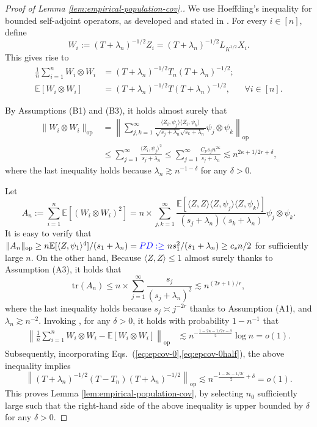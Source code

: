 \documentclass[aos]{imsart}
\newcommand{\tr}{\mathrm{tr}}
\newcommand{\op}{\mathrm{op}}
\newcommand{\pd}[1]{%
	{ \color{blue} PD: #1}%
}
\theoremstyle{plain}
\theoremstyle{definition}
\theoremstyle{definition}
\begin{document}
\begin{appendix}
\begin{proof}[Proof of Lemma \ref{lem:empirical-population-cov}.]
We use Hoeffding's inequality for bounded self-adjoint operators, as developed and stated in \citep{minsker2017some}.
For every $i\in[n]$, define
$$
W_i := (T+\lambda_n)^{-1/2}Z_i = (T+\lambda_n)^{-1/2}L_{K^{1/2}}X_i.
$$
This gives rise to
\begin{align}
\frac{1}{n}\sum_{i=1}^n W_i\otimes W_i &= (T+\lambda_n )^{-1/2}T_n (T+\lambda_n )^{-1/2};\label{eq:epcov-0}\\
\mathbb E[W_i\otimes W_i] &= (T+\lambda_n)^{-1/2} T (T+\lambda_n )^{-1/2}, \;\;\;\;\;\;\forall i\in[n]\label{eq:epcov-0half}.
\end{align}

By Assumptions (B1) and (B3), it holds almost surely that 
\begin{align}
\|W_i\otimes W_i\|_\op&=\left\|\sum_{j,k=1}^{\infty}\frac{\langle Z_i,\psi_j\rangle\langle Z_i,\psi_k\rangle}{\sqrt{s_j+\lambda_n}\sqrt{s_k+\lambda_n}}\psi_j\otimes\psi_k\right\|_\op\nonumber\\
&\leq \sum_{j=1}^{\infty}\frac{\langle Z_i,\psi_j\rangle^2}{s_j+\lambda_n} \leq \sum_{j=1}^{\infty} \frac{C_\nu s_j n^{2\kappa}}{s_j+\lambda_n}  \lesssim n^{2\kappa+1/2r+\delta},
\label{eq:proof-epcov-1}
\end{align}
where the last inequality holds because $\lambda_n\gtrsim n^{-1-\delta}$ for any $\delta>0$. 

Let 
$$
A_n := \sum_{i=1}^n\mathbb E[(W_i\otimes W_i)^2] =n\times\sum_{j,k=1}^{\infty}\frac{\mathbb E[\langle Z,Z\rangle\langle Z,\psi_j\rangle\langle Z,\psi_k\rangle]}{(s_j+\lambda_n)(s_k+\lambda_n)}\psi_j\otimes \psi_k.
$$
It is easy to verify that $\|A_n\|_\op \geq n\mathbb E[\langle Z,\psi_1\rangle^4]/(s_1+\lambda_n)= \pd{\geq \ }  ns_1^2/(s_1+\lambda_n)\geq c_sn/2$ for sufficiently large $n$. 
On the other hand, Because $\langle Z,Z\rangle\leq 1$ almost surely thanks to Assumption (A3), it holds that
\begin{equation}
\tr(A_n) \leq n\times \sum_{j=1}^{\infty} \frac{s_j}{(s_j+\lambda_n)^2} \lesssim n^{(2r+1)/r},
\label{eq:proof-epcov-2}
\end{equation}
where the last inequality holds because $s_j\asymp j^{-2r}$ thanks to Assumption (A1), and $\lambda_n\gtrsim n^{-2}$.
Invoking \citep[Theorem 3.1]{minsker2017some}, for any $\delta>0$, it holds with probability $1-n^{-1}$ that
\begin{align*}
\left\|\frac{1}{n}\sum_{i=1}^n W_i\otimes W_i-\mathbb E[W_i\otimes W_i]\right\|_\op &\lesssim n^{-\frac{1-2\kappa-1/2r-\delta}{2}}\log n = o(1). 
\end{align*}
Subsequently, incorporating Eqs.~(\ref{eq:epcov-0},\ref{eq:epcov-0half}), the above inequality implies
$$
\left\|(T+\lambda_n)^{-1/2}(T-T_n)(T+\lambda_n)^{-1/2}\right\|_\op \lesssim n^{-\frac{1-2\kappa-1/2r}{2}+\delta} = o(1).
$$
This proves Lemma \ref{lem:empirical-population-cov}, by selecting $n_0$ sufficiently large such that the right-hand side of the above inequality is upper bounded by $\delta$ for any $\delta>0$.
\end{proof}


\end{appendix}
\end{document}
